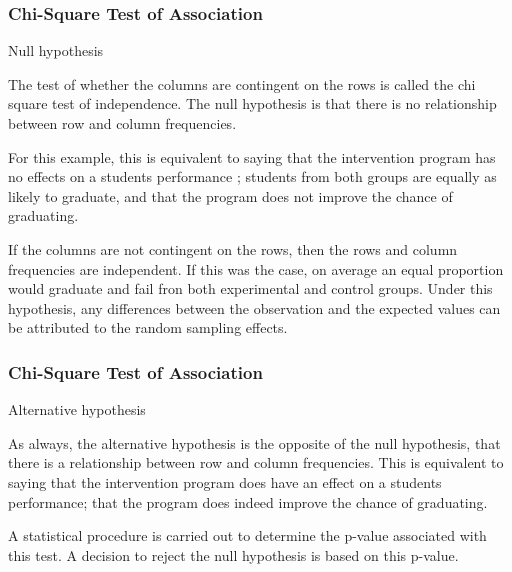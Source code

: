 \begin{frame}
\frametitle{Chi-Square Test of Association}

\Large
Null hypothesis
 
The test of whether the columns are contingent on the rows is called the chi square test of independence. The null hypothesis is that there is no relationship between row and column frequencies.
 
For this example, this is equivalent to saying that the intervention program has no effects on a students performance ; students from both groups are equally as likely to graduate, and that the program does not improve the chance of graduating.
 
If the columns are not contingent on the rows, then the rows and column frequencies are independent. If this was the case, on average an equal proportion would graduate and fail fron both experimental and control groups. Under this hypothesis, any differences between the observation and the expected values can be attributed to the random sampling effects.
 
 \end{frame}

\begin{frame}
\frametitle{Chi-Square Test of Association}

\Large

Alternative hypothesis
 
As always, the alternative hypothesis is the opposite of the null hypothesis, that there is a relationship between row and column frequencies.
This is equivalent to saying that the intervention program does have an effect on a students performance; that the program does indeed improve the chance of graduating. 
 
A statistical procedure is carried out to determine the p-value associated with this test. A decision to reject the null hypothesis is based on this p-value.
 
 \end{frame}

